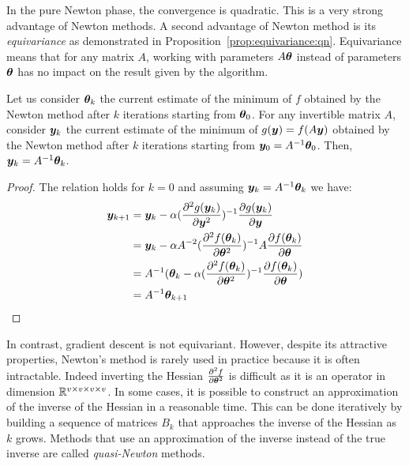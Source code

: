 In the pure Newton phase, the convergence is quadratic. This is a very strong
advantage of Newton methods.
A second advantage of Newton method is its \emph{equivariance} as demonstrated
in Proposition~\ref{prop:equivariance:qn}. Equivariance means that for any
matrix $A$, working with
parameters $A \thetab$ instead of parameters $\thetab$ has no impact on the result given
by the algorithm.
\begin{proposition}
  \label{prop:equivariance:qn}
  Let us consider $\thetab_k$ the current estimate of the minimum of $f$ obtained by
  the Newton method after $k$ iterations starting from $\thetab_0$.
  For any invertible matrix $A$, consider $\yb_k$ the current estimate of the
  minimum of $g(\yb) = f(A\yb)$
  obtained by the Newton method after $k$ iterations starting from $\yb_0 = A^{-1}\thetab_0$.
  Then, $\yb_k = A^{-1} \thetab_k$.
\end{proposition}
\begin{proof}
  The relation holds for $k=0$ and assuming $\yb_k = A^{-1} \thetab_k$ we have:
\begin{align}
  \yb_{k+1} &= \yb_k -\alpha (\partialfrac{\yb^2}{^2 g(\yb_k)})^{-1} \partialfrac{\yb}{g(\yb_k)} \\
  &= \yb_k -\alpha A^{-2}(\partialfrac{\thetab^2}{^2 f(\thetab_k)})^{-1} A \partialfrac{\thetab}{f(\thetab_k)} \\
  &= A^{-1} (\thetab_k -\alpha (\partialfrac{\thetab^2}{^2 f(\thetab_k)})^{-1} \partialfrac{\thetab}{f( \thetab_k)}) \\
            &= A^{-1} \thetab_{k+1} \\
\end{align}
\end{proof}
In contrast, gradient descent is not equivariant.
However, despite its attractive properties, Newton's method is rarely used in
practice because it is often intractable. Indeed inverting
the Hessian $\partialfrac{\thetab^2}{^2 f}$ is difficult as it is an operator in
dimension $\RR^{v \times v \times v \times
  v}$.
In some cases, it is possible to construct an approximation of the inverse of
the Hessian in a reasonable time. This can be done iteratively by building a
sequence of matrices $B_k$ that approaches the inverse of the Hessian as $k$ grows.
Methods that use an approximation of the inverse instead of the true inverse are
called \emph{quasi-Newton} methods. 

